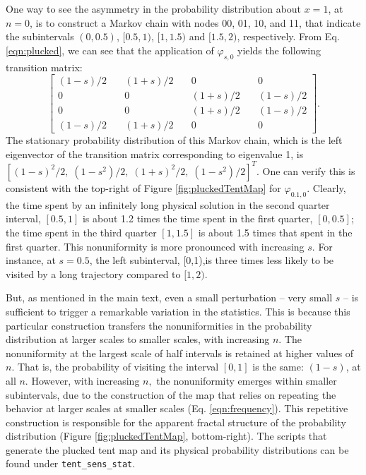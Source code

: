 One way to see the asymmetry in the probability distribution 
about $x=1$, at $n=0$, is to construct a Markov chain with nodes 00, 01, 10, and 11, that indicate the subintervals $(0,0.5)$, $[0.5,1)$, 
$[1,1.5)$ and $[1.5,2)$, respectively. From Eq. \ref{eqn:plucked}, we can see that the application of $\varphi_{s,0}$ yields the following transition matrix:
\[
\begin{bmatrix}
		(1-s)/2\quad & (1+s)/2 \quad & 0 \quad & 0 \\
		0 \quad & 0 \quad & (1+s)/2 \quad & (1-s)/2 \\
		0 \quad & 0  \quad & (1+s)/2 \quad & (1-s)/2 \\
		(1-s)/2 \quad & (1+s)/2 \quad & 0 \quad & 0
\end{bmatrix}
.\] 
The stationary probability distribution of this Markov chain, which 
is the left eigenvector of the transition matrix corresponding to eigenvalue 1, is $[(1-s)^2/2, \; (1-s^2)/2, \; (1+s)^2/2,\; (1-s^2)/2]^T$.
One can verify this is consistent with the top-right of Figure \ref{fig:pluckedTentMap} for $\varphi_{0.1,0}$. Clearly, the time spent by an infinitely long physical solution in the second quarter interval, $[0.5,1]$ is about 1.2 times the time spent in the first quarter, $[0,0.5]$; the time spent in the third quarter $[1,1.5]$ is about 1.5 times that spent in the first quarter. This nonuniformity is more pronounced with increasing $s$. For instance, at $s=0.5$, the left subinterval, [0,1),is three times less likely to be visited by a long trajectory compared to $[1,2)$. 

But, as mentioned in the main text, even a small perturbation -- very small $s$ -- is sufficient to trigger a remarkable variation in the statistics. This is because this particular construction transfers 
the nonuniformities in the probability distribution at larger scales to smaller scales, with increasing $n.$ The nonuniformity at the largest 
scale of half intervals is retained at higher values of $n.$ That is,
the probability of visiting the interval $[0,1]$ is the same: $(1-s)$, at all $n$. However, with increasing $n,$ the nonuniformity emerges within smaller subintervals, due to the construction of the map that relies on repeating the behavior at larger scales at smaller scales (Eq. \ref{eqn:frequency}). This repetitive construction is responsible for the apparent fractal structure of the probability distribution (Figure \ref{fig:pluckedTentMap}, bottom-right). The scripts that generate the plucked tent map and its 
physical probability distributions can be found under \verb+tent_sens_stat+. 

